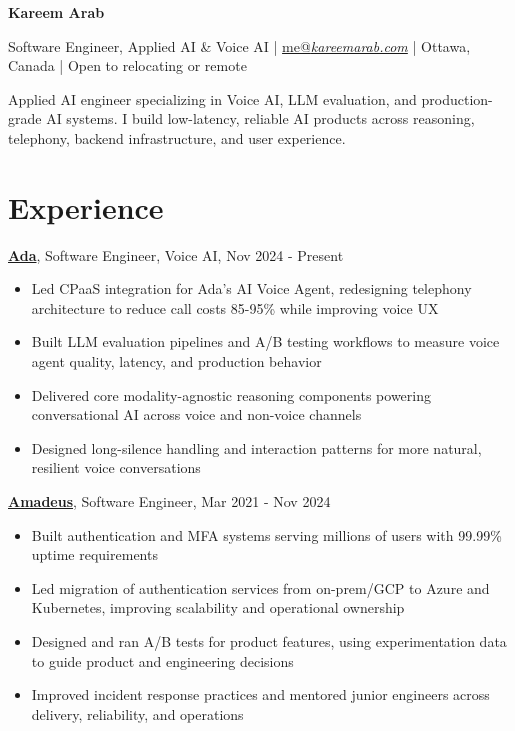 \documentclass[9pt]{article}
\begin{document}
\begin{center}
    {\LARGE \textbf{Kareem Arab}}\par\smallskip
    Software Engineer, Applied AI \& Voice AI | \href{mailto:me@kareemarab.com}{me@\textit{kareemarab.com}} | Ottawa, Canada | Open to relocating or remote
\end{center}

\noindent
Applied AI engineer specializing in Voice AI, LLM evaluation, and production-grade AI systems. I build low-latency, reliable AI products across reasoning, telephony, backend infrastructure, and user experience.

\section*{Experience}

\noindent
\textbf{\href{https://ada.cx}{Ada}}, Software Engineer, Voice AI, Nov 2024 - Present
\begin{itemize}
    \setlength\itemsep{0em}
    \item Led CPaaS integration for Ada's AI Voice Agent, redesigning telephony architecture to reduce call costs 85-95\% while improving voice UX
    \item Built LLM evaluation pipelines and A/B testing workflows to measure voice agent quality, latency, and production behavior
    \item Delivered core modality-agnostic reasoning components powering conversational AI across voice and non-voice channels
    \item Designed long-silence handling and interaction patterns for more natural, resilient voice conversations
\end{itemize}

\noindent
\textbf{\href{https://amadeus.com/en}{Amadeus}}, Software Engineer, Mar 2021 - Nov 2024
\begin{itemize}
    \setlength\itemsep{0em}
    \item Built authentication and MFA systems serving millions of users with 99.99\% uptime requirements
    \item Led migration of authentication services from on-prem/GCP to Azure and Kubernetes, improving scalability and operational ownership
    \item Designed and ran A/B tests for product features, using experimentation data to guide product and engineering decisions
    \item Improved incident response practices and mentored junior engineers across delivery, reliability, and operations
\end{itemize}
\end{document}
